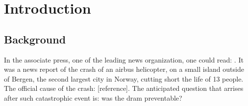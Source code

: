 \documentclass[../Main/thesis.tex]{subfiles}
\begin{document}
\chapter{Introduction}
\label{ch:introduction}

\section{Background}
\label{sec:background}
In the associate press, one of the leading news organization, one could read: .
It was a news report of the crash of an airbus helicopter, on a small island outside of Bergen, the second largest city in Norway, cutting short the life of 13 people. The official cause of the crash:  [reference]. The anticipated question that arrises after such catastrophic event is: was the dram preventable?
\end{document}
